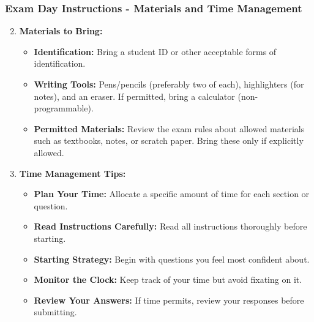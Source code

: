 \documentclass[aspectratio=169]{beamer}
\begin{document}
\begin{frame}[fragile]
    \frametitle{Exam Day Instructions - Materials and Time Management}
    \begin{enumerate}
        \setcounter{enumi}{1}
        \item \textbf{Materials to Bring:}
            \begin{itemize}
                \item \textbf{Identification:} Bring a student ID or other acceptable forms of identification.
                \item \textbf{Writing Tools:} Pens/pencils (preferably two of each), highlighters (for notes), and an eraser. If permitted, bring a calculator (non-programmable).
                \item \textbf{Permitted Materials:} Review the exam rules about allowed materials such as textbooks, notes, or scratch paper. Bring these only if explicitly allowed.
            \end{itemize}

        \item \textbf{Time Management Tips:}
            \begin{itemize}
                \item \textbf{Plan Your Time:} Allocate a specific amount of time for each section or question.
                \item \textbf{Read Instructions Carefully:} Read all instructions thoroughly before starting.
                \item \textbf{Starting Strategy:} Begin with questions you feel most confident about.
                \item \textbf{Monitor the Clock:} Keep track of your time but avoid fixating on it.
                \item \textbf{Review Your Answers:} If time permits, review your responses before submitting.
            \end{itemize}
    \end{enumerate}
\end{frame}
\end{document}
